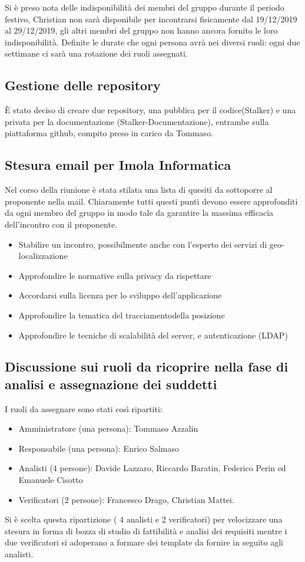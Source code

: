 Si è preso nota delle indisponibilità dei membri del gruppo durante il periodo festivo, Christian non sarà disponibile per incontrarsi fisicamente dal 19/12/2019 al 29/12/2019, gli altri membri del gruppo non hanno ancora fornito le loro indisponibilità. 
Definite le durate che ogni persona avrà nei diversi ruoli: ogni due settimane ci sarà una rotazione dei ruoli assegnati. \\

\subsection{Gestione delle repository}
È stato deciso di creare due repository, una pubblica per il codice(Stalker) e una privata per la documentazione (Stalker-Documentazione), entrambe sulla piattaforma github, compito preso in carico da Tommaso. \\

\subsection{Stesura email per Imola Informatica}
Nel corso della riunione è stata stilata una lista di quesiti da sottoporre al proponente nella mail. 
Chiaramente tutti questi punti devono essere approfonditi da ogni membro del gruppo in modo tale da garantire la massima efficacia dell'incontro con il proponente.
\begin{itemize}
\item Stabilire un incontro, possibilmente anche con l’esperto dei servizi di geo-localizzazione
\item Approfondire le normative sulla privacy da rispettare
\item Accordarsi sulla licenza per lo sviluppo dell'applicazione
\item Approfondire la tematica del tracciamentodella posizione
\item Approfondire le tecniche di scalabilità del server, e autenticazione (LDAP)
\end{itemize} 

\subsection{ Discussione sui ruoli da ricoprire nella fase di analisi e assegnazione dei suddetti}
I ruoli da assegnare sono stati così ripartiti: 
\begin{itemize}
\item Amministratore (una persona): Tommaso Azzalin
\item Responsabile (una persona): Enrico Salmaso
\item Analisti (4 persone): Davide Lazzaro, Riccardo Baratin, Federico Perin ed Emanuele Cisotto
\item Verificatori (2 persone): Francesco Drago, Christian Mattei.
\end{itemize}
Si è scelta questa ripartizione ( 4 analisti e 2 verificatori) per velocizzare una stesura in forma di 
bozza di studio di fattibilità e analisi dei requisiti mentre i due verificatori si adoperano a formare dei template
da fornire in seguito agli analisti.
\\

